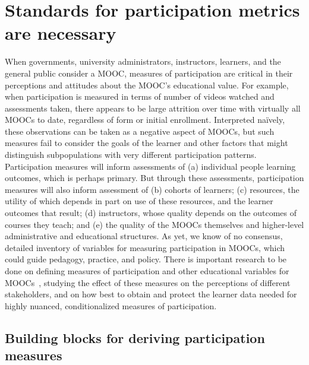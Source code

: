\section{Standards for participation metrics are necessary}



When governments, university administrators, instructors, learners, and
the general public consider a MOOC, measures of participation are
critical in their perceptions and attitudes about the MOOC's educational
value. For example, when participation is measured in terms of number of
videos watched and assessments taken, there appears to be large
attrition over time with virtually all MOOCs to date, regardless of form
or initial enrollment. Interpreted na\"{i}vely, these observations can be
taken as a negative aspect of MOOCs, but such measures fail to consider
the goals of the learner and other factors that might distinguish
subpopulations with very different participation patterns.
Participation measures will inform assessments of (a) individual people
learning outcomes, which is perhaps primary. But through these
assessments, participation measures will also inform assessment of (b)
cohorts of learners; (c) resources, the utility of which depends in part
on use of these resources, and the learner outcomes that result; (d)
instructors, whose quality depends on the outcomes of courses they
teach; and (e) the quality of the MOOCs themselves and higher-level
administrative and educational structures.  As yet, we know of no
consensus, detailed inventory of variables for measuring participation
in MOOCs, which could guide pedagogy, practice, and policy.
There is
important research to be done on defining measures of participation and
other educational variables for MOOCs~\cite{deboer-ho-reconceptualizing},
studying the effect of these measures on the perceptions of different
stakeholders, and on how best to obtain and protect the
learner data needed for highly nuanced, conditionalized
measures of participation.  

\subsection{Building blocks for deriving participation measures}

